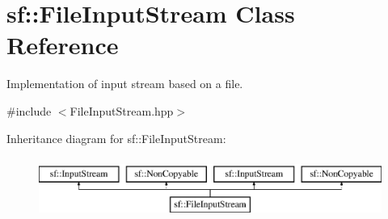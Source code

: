 \hypertarget{classsf_1_1_file_input_stream}{\section{sf\-:\-:File\-Input\-Stream Class Reference}
\label{classsf_1_1_file_input_stream}
}


Implementation of input stream based on a file.  




{\ttfamily \#include $<$File\-Input\-Stream.\-hpp$>$}

Inheritance diagram for sf\-:\-:File\-Input\-Stream\-:\begin{figure}[H]
\begin{center}
\leavevmode
\includegraphics[height=2.000000cm]{classsf_1_1_file_input_stream}
\end{center}
\end{figure}
